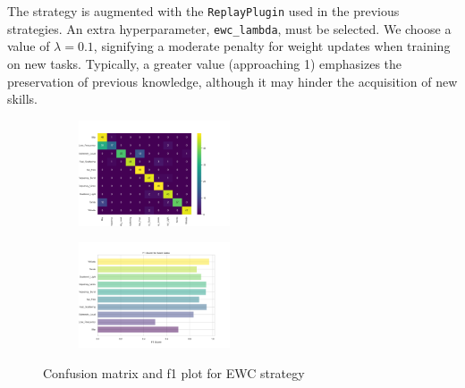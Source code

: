 The strategy is augmented with the \verb|ReplayPlugin| used in the previous strategies. An extra hyperparameter, \verb|ewc_lambda|, must be selected. We choose a value of $\lambda = 0.1$, signifying a moderate penalty for weight updates when training on new tasks. Typically, a greater value (approaching 1) emphasizes the preservation of previous knowledge, although it may hinder the acquisition of new skills.

\begin{figure}[H]
\centering
\begin{subfigure}
  \centering
  \includegraphics[width=0.49\textwidth]{Images/cm_EWC_MultiView_100epochs.png}  
  \label{fig:sub-first}
\end{subfigure}
\begin{subfigure}
  \centering
  \includegraphics[width=0.49\textwidth]{Images/f1_EWC_MultiView_100epochs.png}  
  \label{fig:sub-second}
\end{subfigure}
\caption{Confusion matrix and f1 plot for EWC strategy}
\label{fig:cm_f1_ewc_baseline}
\end{figure}

